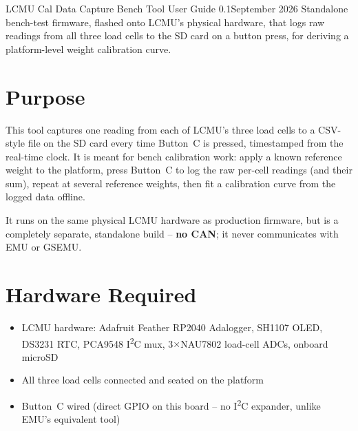 \documentclass[11pt,letterpaper]{article}
\newcommand{\docversion}{0.1}
\newcommand{\docdate}{September 2026}
\begin{document}


\KJOtitlepage%
  {LCMU Cal Data Capture}%
  {Bench Tool User Guide}%
  {\docversion}{\docdate}%
  {Standalone bench-test firmware, flashed onto LCMU's physical hardware,
   that logs raw readings from all three load cells to the SD card on a
   button press, for deriving a platform-level weight calibration curve.}

\tableofcontents\newpage

\section{Purpose}

This tool captures one reading from each of LCMU's three load cells to a
CSV-style file on the SD card every time Button~C is pressed, timestamped
from the real-time clock. It is meant for bench calibration work: apply a
known reference weight to the platform, press Button~C to log the raw
per-cell readings (and their sum), repeat at several reference weights,
then fit a calibration curve from the logged data offline.

It runs on the same physical LCMU hardware as production firmware, but is
a completely separate, standalone build -- \textbf{no CAN}; it never
communicates with EMU or GSEMU.

\section{Hardware Required}

\begin{itemize}[nosep]
  \item LCMU hardware: Adafruit Feather RP2040 Adalogger, SH1107 OLED,
        DS3231 RTC, PCA9548 I\textsuperscript{2}C mux, 3$\times$NAU7802
        load-cell ADCs, onboard microSD
  \item All three load cells connected and seated on the platform
  \item Button~C wired (direct GPIO on this board -- no I\textsuperscript{2}C
        expander, unlike EMU's equivalent tool)
\end{itemize}
\end{document}
